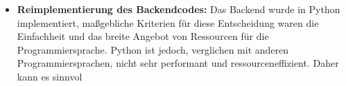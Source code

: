 \documentclass[../main.tex]{subfiles}
\begin{document}
\begin{itemize}
	\item \textbf{Reimplementierung des Backendcodes:}
	      Das Backend wurde in Python implementiert, maßgebliche Kriterien für diese Entscheidung waren die Einfachheit und das breite Angebot von Ressourcen für die
	      Programmiersprache. Python ist jedoch, verglichen mit anderen Programmiersprachen, nicht sehr performant und ressourceneffizient. Daher kann es sinnvol

\end{itemize}
\end{document}
